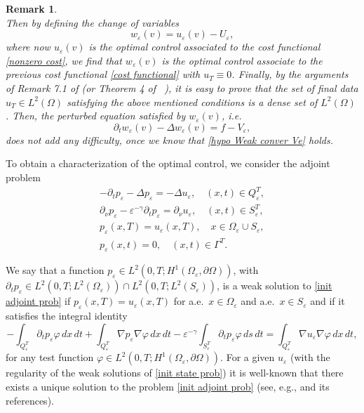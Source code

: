 \documentclass[10pt,a4paper]{amsart}
\numberwithin{equation}{section}
\newtheorem{remark}[theorem]{Remark}
\begin{document}
\begin{remark}
\[\]
Then by defining the change of variables
\[
w{_{\varepsilon }(v)=u_{\varepsilon }(v)-}U_{\varepsilon },
\]
where now ${u_{\varepsilon }(v)}$ is the optimal control associated to the
cost functional \eqref{nonzero cost}, we find that $w{_{\varepsilon }(v)}$
is the optimal control associate to the previous cost functional \eqref{cost
functional} with $u_{T}\equiv 0$. Finally, by the arguments of Remark 7.1
of \cite{DiPoShAttouch} (or Theorem 4 of \  \cite{DiPoShRACSAM}), it is easy
to prove that the set of final data $u_{T}\in L^2(\Omega )$ satisfying the
above mentioned conditions is a dense set of $L^2(\Omega )$. Then, the
perturbed equation satisfied by $w{_{\varepsilon }(v)}$, i.e.
\[
\partial _{t}w{_{\varepsilon }(v)}-\Delta w{_{\varepsilon }(v)}
=f-V_{\varepsilon },
\]
does not add any difficulty, once we know that \eqref{hypo Weak conver Ve}
holds.
\end{remark}

To obtain a characterization of the optimal control, we consider the
adjoint problem
\begin{equation}
\begin{gathered}
-\partial _{t}p_{\varepsilon }-\Delta p_{\varepsilon }=-\Delta
u_{\varepsilon }, \quad (x,t)\in Q_{\varepsilon }^{T}, \\
\partial _{\nu }p_{\varepsilon }-\varepsilon ^{-\gamma }\partial
_{t}p_{\varepsilon }=\partial _{\nu }u_{\varepsilon }, \quad (x,t)\in
S_{\varepsilon }^{T}, \\
p_{\varepsilon }(x,T)=u_{\varepsilon }(x,T), \quad x\in \Omega _{\varepsilon
}\cup S_{\varepsilon }, \\
p_{\varepsilon }(x,t)=0, \quad (x,t)\in \Gamma ^{T}.
\end{gathered} \label{init adjoint prob}
\end{equation}

We say that a function $p_{\varepsilon }\in L^2(0,T;H^{1}(\Omega
_{\varepsilon },\partial \Omega ))$, with 
$\partial _{t}p_{\varepsilon }\in
L^2(0,T;L^2(\Omega _{\varepsilon }))\cap L^2(0,T;L^2(S_{\varepsilon}))$, 
is a weak solution to  \eqref{init adjoint prob} if 
$p_{\varepsilon }(x,T)=u_{\varepsilon }(x,T)$ for a.e.\
 $x\in \Omega_{\varepsilon }$ and a.e.\ $x\in S_{\varepsilon }$ and if it satisfies the
integral identity
\begin{equation}
-\int _{Q_{\varepsilon }^{T}}\partial _{t}p_{\varepsilon }\varphi \,dx\,dt
+\int _{Q_{\varepsilon }^{T}}\nabla p_{\varepsilon }\nabla
\varphi \,dx\,dt-\varepsilon ^{-\gamma }\int _{S_{\varepsilon
}^{T}}\partial _{t}p_{\varepsilon }\varphi \,ds\,dt
=\int_{Q_{\varepsilon }^{T}}\nabla u_{\varepsilon }\nabla \varphi \,dx\,dt,
\label{int ident init adjoint prob}
\end{equation}
for any test function $\varphi \in L^2(0,T;H^{1}(\Omega _{\varepsilon
},\partial \Omega ))$. 
For a given $u_{\varepsilon }$ (with the regularity
of the weak solutions of \eqref{init state prob}) it is well-known that
there exists a unique solution to the problem \eqref{init adjoint prob}
(see, e.g., \cite{BejeDVrabie} and its references).
\end{document}
